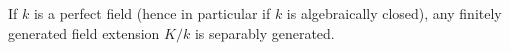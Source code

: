If $k$ is a perfect field (hence in particular if $k$ is algebraically closed), any finitely generated field extension $K/k$ is separably generated.
